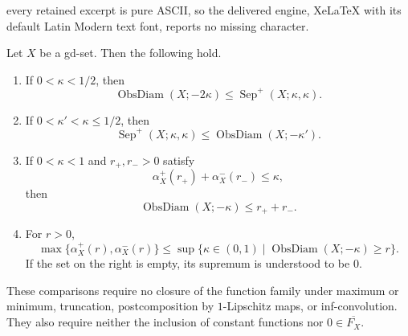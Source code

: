 \documentclass[10pt,a4paper]{amsart}
\DeclareMathOperator{\od}{ObsDiam}
\begin{document}
every retained excerpt is pure ASCII, so the delivered engine, XeLaTeX with its default Latin Modern text font, reports no missing character.
\begin{theorem}
\label{thm:elementary-feature-concentration-comparison}
Let $X$ be a gd-set.  Then the following hold.
\begin{enumerate}[label=\textup{(\roman*)}]
\item If $0<\kappa<1/2$, then
\[
\od(X;-2\kappa)\leq\operatorname{Sep}^+(X;\kappa,\kappa).
\]
\item If $0<\kappa'<\kappa\leq1/2$, then
\[
\operatorname{Sep}^+(X;\kappa,\kappa)\leq\od(X;-\kappa').
\]
\item If $0<\kappa<1$ and $r_+,r_->0$ satisfy
\[
\alpha_X^+(r_+)+\alpha_X^-(r_-)\leq\kappa,
\]
then
\[
\od(X;-\kappa)\leq r_++r_-.
\]
\item For $r>0$,
\[
\max\{\alpha_X^+(r),\alpha_X^-(r)\}
\leq\sup\{\kappa\in(0,1)\mid\od(X;-\kappa)\geq r\}.
\]
If the set on the right is empty, its supremum is understood to be $0$.
\end{enumerate}
These comparisons require no closure of the function family under maximum or
minimum, truncation, postcomposition by $1$-Lipschitz maps, or
inf-convolution.  They also require neither the inclusion of constant
functions nor $0\in\overline{F_X}$.
\end{theorem}
\end{document}
